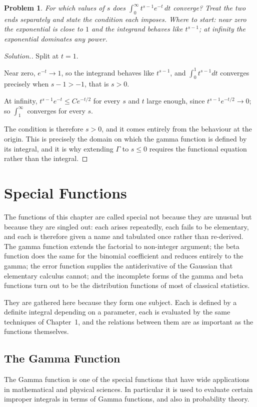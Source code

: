 \documentclass[12pt,a4paper]{report}
\theoremstyle{definition}
\theoremstyle{plain}
\newtheorem{problemx}{Problem}[section]
\newenvironment{problem}{\begin{problemx}}{\end{problemx}}
\newenvironment{solution}
  {\renewcommand{\qedsymbol}{}\begin{proof}[\textit{Solution}.]}
  {\end{proof}}
\begin{document}
\begin{problem}
\label{prob:gammaconv}
For which values of $s$ does $\displaystyle\int^{\infty}_{0}t^{s-1}e^{-t}\,dt$
converge? Treat the two ends separately and state the condition each imposes.
\emph{Where to start: near zero the exponential is close to $1$ and the
integrand behaves like $t^{s-1}$; at infinity the exponential dominates any
power.}
\end{problem}

\begin{solution}
Split at $t=1$.

Near zero, $e^{-t}\to1$, so the integrand behaves like $t^{s-1}$, and
$\int^{1}_{0}t^{s-1}dt$ converges precisely when $s-1>-1$, that is $s>0$.

At infinity, $t^{s-1}e^{-t}\leq C e^{-t/2}$ for every $s$ and $t$ large enough,
since $t^{s-1}e^{-t/2}\to0$; so $\int^{\infty}_{1}$ converges for every $s$.

The condition is therefore $s>0$, and it comes entirely from the behaviour at
the origin. This is precisely the domain on which the gamma function is defined
by its integral, and it is why extending $\Gamma$ to $s\leq0$ requires the
functional equation rather than the integral.
\end{solution}

\chapter{Special Functions}

The functions of this chapter are called special not because they are unusual
but because they are singled out: each arises repeatedly, each fails to be
elementary, and each is therefore given a name and tabulated once rather than
re-derived. The gamma function extends the factorial to non-integer argument;
the beta function does the same for the binomial coefficient and reduces
entirely to the gamma; the error function supplies the antiderivative of the
Gaussian that elementary calculus cannot; and the incomplete forms of the gamma
and beta functions turn out to be the distribution functions of most of
classical statistics.

They are gathered here because they form one subject. Each is defined by a
definite integral depending on a parameter, each is evaluated by the same
techniques of Chapter~1, and the relations between them are as important as the
functions themselves.

\section{The Gamma Function}
\vspace*{-6mm}
The Gamma function is one of the special functions that have wide applications in mathematical and physical sciences. In particular it is used to evaluate certain improper integrals in terms of Gamma functions, and also in probability theory.
\end{document}

